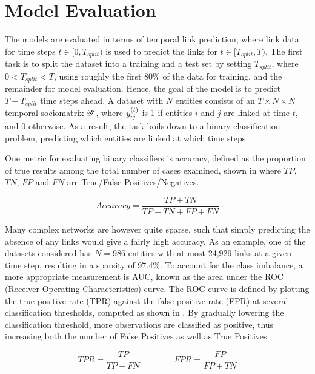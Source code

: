 \section{Model Evaluation}\label{sec:meval}

The models are evaluated in terms of temporal link prediction, where link data for time steps $t\in [0,T_{split})$ is used to predict the links for $t\in [T_{split},T)$. The first task is to split the dataset into a training and a test set by setting $T_{split}$, where $0 < T_{split} < T$, using roughly the first 80\% of the data for training, and the remainder for model evaluation. Hence, the goal of the model is to predict $T-T_{split}$ time steps ahead. A dataset with $N$ entities consists of an $T\times N\times N$ temporal sociomatrix $\bm{\mathscr{Y}}$, where $\sub(y)^\t$ is 1 if entities $i$ and $j$ are linked at time $t$, and 0 otherwise. As a result, the task boils down to a binary classification problem, predicting which entities are linked at which time steps.

One metric for evaluating binary classifiers is accuracy, defined as the proportion of true results among the total number of cases examined, shown in  where $TP$, $TN$, $FP$ and $FN$ are True/False Positives/Negatives.

\begin{equation}\label{eq:eval-accuracy}
    Accuracy = \frac{TP+TN}{TP+TN+FP+FN}
\end{equation}

Many complex networks are however quite sparse, such that simply predicting the absence of any links would give a fairly high accuracy. As an example, one of the datasets considered has $N=986$ entities with at most 24,929 links at a given time step, resulting in a sparsity of 97.4\%. To account for the class imbalance, a more appropriate measurement is AUC, known as the area under the ROC (Receiver Operating Characteristics) curve. The ROC curve is defined by plotting the true positive rate (TPR) against the false positive rate (FPR) at several classification thresholds, computed as shown in . By gradually lowering the classification threshold, more observations are classified as positive, thus increasing both the number of False Positives as well as True Positives.

\begin{equation}\label{eq:eval-tpr-fpr}
    TPR = \frac{TP}{TP + FN} \qquad\qquad FPR = \frac{FP}{FP + TN}
\end{equation}

